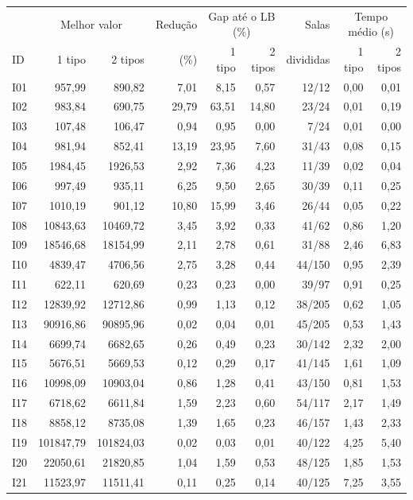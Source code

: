 \begin{tabular}{lrrrrrrrr}
\hline
 & \multicolumn{2}{c}{Melhor valor} & Redução & \multicolumn{2}{c}{Gap até o LB (\%)} & Salas & \multicolumn{2}{c}{Tempo médio (s)} \\
ID & 1 tipo & 2 tipos & (\%) & 1 tipo & 2 tipos & divididas & 1 tipo & 2 tipos \\
\hline
I01 & 957,99 & 890,82 & 7,01 & 8,15 & 0,57 & 12/12 & 0,00 & 0,01 \\
I02 & 983,84 & 690,75 & 29,79 & 63,51 & 14,80 & 23/24 & 0,01 & 0,19 \\
I03 & 107,48 & 106,47 & 0,94 & 0,95 & 0,00 & 7/24 & 0,01 & 0,00 \\
I04 & 981,94 & 852,41 & 13,19 & 23,95 & 7,60 & 31/43 & 0,08 & 0,15 \\
I05 & 1984,45 & 1926,53 & 2,92 & 7,36 & 4,23 & 11/39 & 0,02 & 0,04 \\
I06 & 997,49 & 935,11 & 6,25 & 9,50 & 2,65 & 30/39 & 0,11 & 0,25 \\
I07 & 1010,19 & 901,12 & 10,80 & 15,99 & 3,46 & 26/44 & 0,05 & 0,22 \\
I08 & 10843,63 & 10469,72 & 3,45 & 3,92 & 0,33 & 41/62 & 0,86 & 1,20 \\
I09 & 18546,68 & 18154,99 & 2,11 & 2,78 & 0,61 & 31/88 & 2,46 & 6,83 \\
I10 & 4839,47 & 4706,56 & 2,75 & 3,28 & 0,44 & 44/150 & 0,95 & 2,39 \\
I11 & 622,11 & 620,69 & 0,23 & 0,23 & 0,00 & 39/97 & 0,91 & 0,25 \\
I12 & 12839,92 & 12712,86 & 0,99 & 1,13 & 0,12 & 38/205 & 0,62 & 1,05 \\
I13 & 90916,86 & 90895,96 & 0,02 & 0,04 & 0,01 & 45/205 & 0,53 & 1,43 \\
I14 & 6699,74 & 6682,65 & 0,26 & 0,49 & 0,23 & 30/142 & 2,32 & 2,00 \\
I15 & 5676,51 & 5669,53 & 0,12 & 0,29 & 0,17 & 41/145 & 1,61 & 1,09 \\
I16 & 10998,09 & 10903,04 & 0,86 & 1,28 & 0,41 & 43/150 & 0,81 & 1,53 \\
I17 & 6718,62 & 6611,84 & 1,59 & 2,23 & 0,60 & 54/117 & 2,17 & 1,49 \\
I18 & 8858,12 & 8735,08 & 1,39 & 1,65 & 0,23 & 46/157 & 1,43 & 2,33 \\
I19 & 101847,79 & 101824,03 & 0,02 & 0,03 & 0,01 & 40/122 & 4,25 & 5,40 \\
I20 & 22050,61 & 21820,85 & 1,04 & 1,59 & 0,53 & 48/125 & 1,85 & 1,53 \\
I21 & 11523,97 & 11511,41 & 0,11 & 0,25 & 0,14 & 40/125 & 7,25 & 3,55 \\

\end{tabular}
